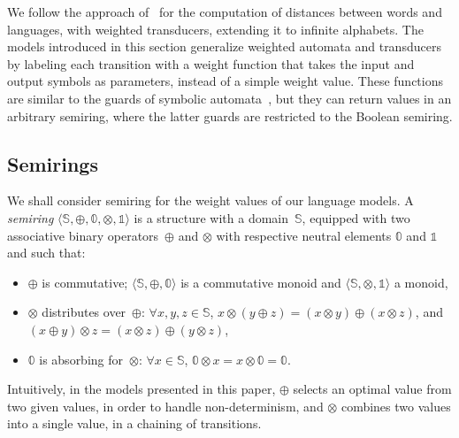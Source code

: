 \documentclass[runningheads]{llncs}
\def\<#1>{\langle #1 \rangle}
\newcommand{\Semiring}{\mathbb{S}}
\newcommand{\zero}{\mathbb{0}}
\newcommand{\one}{\mathbb{1}}
\begin{document}
We follow the approach of~\cite{Mohri03EDWA} for the computation of distances
between words and languages, with weighted transducers, 
extending it to infinite alphabets.
%
The models introduced in this section generalize 
weighted automata and transducers~\cite{Droste09handbook} 
by labeling each transition with a weight function that takes the 
input and output symbols as parameters, instead of a simple weight value.
These functions are similar to the guards of symbolic automata~\cite{dAntoniVeanes17CAV,dAntoni21CACM},
but they can return values in an arbitrary semiring, 
where the latter guards are restricted to the Boolean semiring.


\subsection{Semirings}
\label{section:semiring}
We shall consider semiring for the weight values of our language models.
%
A \emph{semiring} $\< \Semiring, \oplus, \zero, \otimes, \one>$ 
is a structure with a domain~$\Semiring$,
equipped with two associative
binary operators~$\oplus$ and $\otimes$
with respective neutral elements $\zero$ and $\one$ and such that:
\begin{itemize}
\item $\oplus$ is commutative;
 $\< \Semiring, \oplus, \zero>$ is a commutative monoid 
   and $\< \Semiring, \otimes, \one>$ a monoid,
\item $\otimes$ distributes over~$\oplus$:  $\forall x, y, z \in \mathbb{S}$,
$x \otimes (y \oplus z) = (x \otimes y) \oplus (x \otimes z)$, 
and $(x \oplus y) \otimes z = (x \otimes z) \oplus (y \otimes z)$,
\item $\zero$ is absorbing for~$\otimes$: 
$\forall x\in \mathbb{S}$, $\zero \otimes x = x \otimes \zero = \zero$.
\end{itemize}
%
Intuitively, in the models presented in this paper, 
$\oplus$ selects an optimal value from two given values, 
in order to handle non-determinism, 
and $\otimes$ combines two values into a single value, 
in a chaining of transitions.
\end{document}
